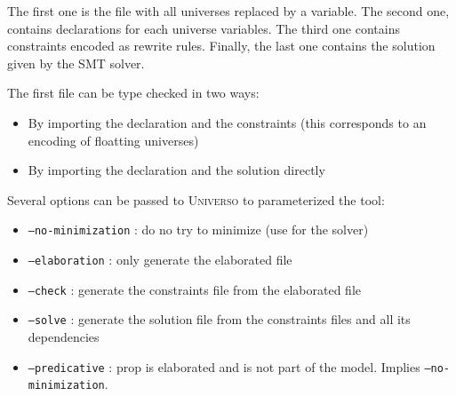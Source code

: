 \documentclass[conference]{IEEEtran}
\newcommand{\universo}{\textsc{Universo}}
\begin{document}
The first one is the file with all universes replaced by a variable. The second one, contains declarations for each universe variables. The third one contains constraints encoded as rewrite rules.
Finally, the last one contains the solution given by the SMT solver.

The first file can be type checked in two ways:
\begin{itemize}
\item By importing the declaration and the constraints (this corresponds to an encoding of floatting universes)
\item By importing the declaration and the solution directly
\end{itemize}

Several options can be passed to \universo{} to parameterized the tool:
\begin{itemize}
\item \texttt{--no-minimization} : do no try to minimize (use for the solver)
\item \texttt{--elaboration} : only generate the elaborated file
\item \texttt{--check} : generate the constraints file from the elaborated file
\item \texttt{--solve} : generate the solution file from the constraints files and all its dependencies
\item \texttt{--predicative} : prop is elaborated and is not part of the model. Implies \texttt{--no-minimization}.
\end{itemize}
\end{document}
